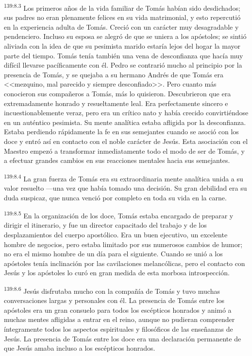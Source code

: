 \par 
\textsuperscript{139:8.3} Los primeros años de la vida familiar de Tomás habían sido desdichados; sus padres no eran plenamente felices en su vida matrimonial, y esto repercutió en la experiencia adulta de Tomás. Creció con un carácter muy desagradable y pendenciero. Incluso su esposa se alegró de que se uniera a los apóstoles; se sintió aliviada con la idea de que su pesimista marido estaría lejos del hogar la mayor parte del tiempo. Tomás tenía también una vena de desconfianza que hacía muy difícil llevarse pacíficamente con él. Pedro se contrarió mucho al principio por la presencia de Tomás, y se quejaba a su hermano Andrés de que Tomás era <<mezquino, mal parecido y siempre desconfiado>>. Pero cuanto más conocieron sus compañeros a Tomás, más lo quisieron. Descubrieron que era extremadamente honrado y resueltamente leal. Era perfectamente sincero e incuestionablemente veraz, pero era un crítico nato y había crecido convirtiéndose en un auténtico pesimista. Su mente analítica estaba afligida por la desconfianza. Estaba perdiendo rápidamente la fe en sus semejantes cuando se asoció con los doce y entró así en contacto con el noble carácter de Jesús. Esta asociación con el Maestro empezó a transformar inmediatamente todo el modo de ser de Tomás, y a efectuar grandes cambios en sus reacciones mentales hacia sus semejantes.

\par 
\textsuperscript{139:8.4} La gran fuerza de Tomás era su extraordinaria mente analítica unida a su valor resuelto ---una vez que había tomado una decisión. Su gran debilidad era su duda suspicaz, que nunca venció por completo en toda su vida en la carne.

\par 
\textsuperscript{139:8.5} En la organización de los doce, Tomás estaba encargado de preparar y dirigir el itinerario, y fue un director capacitado del trabajo y de los desplazamientos del cuerpo apostólico. Era un buen ejecutivo, un excelente hombre de negocios, pero estaba limitado por sus numerosos cambios de humor; no era el mismo hombre de un día para el siguiente. Cuando se unió a los apóstoles tenía inclinación por las cavilaciones melancólicas, pero el contacto con Jesús y los apóstoles lo curó en gran medida de esta morbosa introspección.

\par 
\textsuperscript{139:8.6} Jesús disfrutaba mucho con la compañía de Tomás y tuvo muchas conversaciones largas y personales con él. La presencia de Tomás entre los apóstoles era un gran consuelo para todos los escépticos honrados y animó a muchas mentes afligidas a entrar en el reino, aunque no pudieran comprender íntegramente todos los aspectos espirituales y filosóficos de las enseñanzas de Jesús. La presencia de Tomás entre los doce era una declaración permanente de que Jesús amaba incluso a los escépticos honrados.

